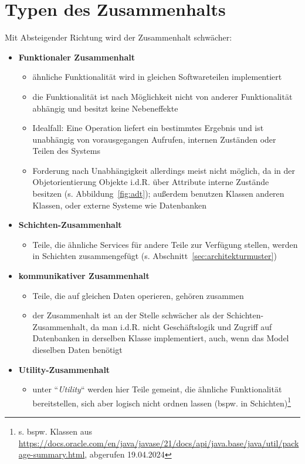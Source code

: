 \section{Typen des Zusammenhalts}


\begin{tcolorbox}[title=Typen des Zusammenhalts]

    Mit Absteigender Richtung wird der Zusammenhalt schwächer:

\begin{itemize}
    \item \textbf{Funktionaler Zusammenhalt}
    \begin{itemize}
        \item ähnliche Funktionalität wird in gleichen Softwareteilen implementiert
        \item die Funktionalität ist nach Möglichkeit nicht von anderer Funktionalität abhängig und besitzt keine Nebeneffekte
        \item Idealfall: Eine Operation liefert ein bestimmtes Ergebnis und ist unabhängig von vorausgegangen Aufrufen, internen Zuständen oder Teilen des Systems
        \item Forderung nach Unabhängigkeit allerdings meist nicht möglich, da in der Objetorientierung Objekte i.d.R. über Attribute interne Zustände besitzen (s. Abbildung~\ref{fig:adt}); außerdem benutzen Klassen anderen Klassen, oder externe Systeme wie Datenbanken
    \end{itemize}

    \item \textbf{Schichten-Zusammenhalt}
    \begin{itemize}
        \item Teile, die ähnliche Services für andere Teile zur Verfügung stellen, werden in Schichten zusammengefügt (s. Abschnitt~\ref{sec:architekturmuster})
    \end{itemize}
    \item \textbf{kommunikativer Zusammenhalt}
    \begin{itemize}
        \item Teile, die auf gleichen Daten operieren, gehören zusammen
        \item der Zusammenhalt ist an der Stelle schwächer als der Schichten-Zusammenhalt, da man i.d.R. nicht Geschäftslogik und Zugriff auf Datenbanken in derselben Klasse implementiert, auch, wenn das Model dieselben Daten benötigt
    \end{itemize}
    \item \textbf{Utility-Zusammenhalt}
    \begin{itemize}
        \item unter ``\textit{Utility}`` werden hier Teile gemeint, die ähnliche Funktionalität bereitstellen, sich aber logisch nicht ordnen lassen (bspw. in Schichten)\footnote{s. bspw. Klassen aus \url{https://docs.oracle.com/en/java/javase/21/docs/api/java.base/java/util/package-summary.html}, abgerufen 19.04.2024}
    \end{itemize}
\end{itemize}
    \end{tcolorbox}